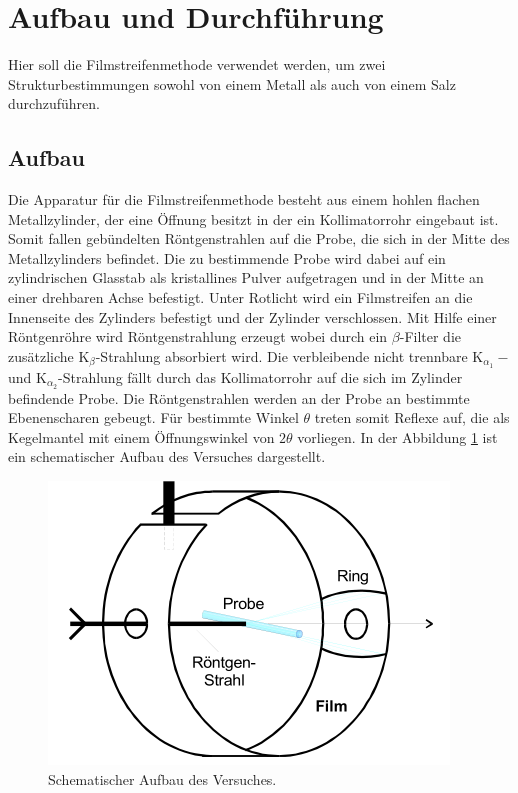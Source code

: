 \newpage
\section{Aufbau und Durchführung}
\label{sec:Durchführung}
Hier soll die Filmstreifenmethode verwendet werden,
um zwei Strukturbestimmungen
sowohl von einem Metall als auch von
einem Salz durchzuführen.
\subsection{Aufbau}
\label{subsec:Aufbau}
Die Apparatur für die Filmstreifenmethode
besteht aus einem hohlen flachen Metallzylinder,
der eine Öffnung besitzt
in der ein Kollimatorrohr eingebaut ist.
Somit fallen gebündelten Röntgenstrahlen auf
 die Probe, die sich in
der Mitte des Metallzylinders befindet.
Die zu bestimmende Probe wird dabei auf ein
zylindrischen Glasstab
als kristallines Pulver aufgetragen und in der Mitte an einer drehbaren
Achse befestigt. Unter Rotlicht wird ein Filmstreifen an die Innenseite
des Zylinders befestigt und der Zylinder verschlossen.
Mit Hilfe einer Röntgenröhre wird Röntgenstrahlung erzeugt
wobei durch ein $\beta$-Filter die zusätzliche
$\mathrm{K}_\beta$-Strahlung absorbiert wird.
Die verbleibende nicht trennbare  $\mathrm{K}_{\alpha_1}-$
und $\mathrm{K}_{\alpha_2}$-Strahlung fällt durch das Kollimatorrohr
auf die sich im Zylinder befindende Probe. Die Röntgenstrahlen werden an
der Probe an bestimmte Ebenenscharen gebeugt. Für bestimmte Winkel $\theta$ treten
somit Reflexe auf, die als Kegelmantel mit einem Öffnungswinkel von $2\theta$
vorliegen. In der Abbildung \ref{fig:aufbau} ist ein schematischer Aufbau des Versuches dargestellt.
\begin{figure}
  \centering
  \includegraphics{Aufbau.PNG}
  \caption{Schematischer Aufbau des Versuches.\cite{sample}}
  \label{fig:aufbau}
 \end{figure}
\FloatBarrier
